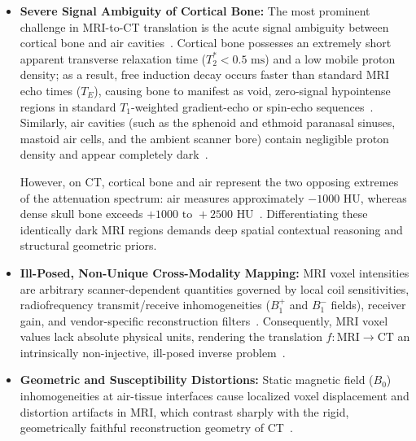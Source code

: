 \begin{itemize}
    \item \textbf{Severe Signal Ambiguity of Cortical Bone:} The most prominent challenge in MRI-to-CT translation is the acute signal ambiguity between cortical bone and air cavities~\cite{edmund2017review,thummerer2023synthrad2023}. Cortical bone possesses an extremely short apparent transverse relaxation time ($T_2^* < 0.5\text{ ms}$) and a low mobile proton density; as a result, free induction decay occurs faster than standard MRI echo times ($T_E$), causing bone to manifest as void, zero-signal hypointense regions in standard $T_1$-weighted gradient-echo or spin-echo sequences~\cite{edmund2017review}. Similarly, air cavities (such as the sphenoid and ethmoid paranasal sinuses, mastoid air cells, and the ambient scanner bore) contain negligible proton density and appear completely dark~\cite{edmund2017review,korsholm2018clinical}. 
    
    However, on CT, cortical bone and air represent the two opposing extremes of the attenuation spectrum: air measures approximately $-1000\text{ HU}$, whereas dense skull bone exceeds $+1000\text{ to }+2500\text{ HU}$~\cite{thummerer2023synthrad2023}. Differentiating these identically dark MRI regions demands deep spatial contextual reasoning and structural geometric priors.
    \item \textbf{Ill-Posed, Non-Unique Cross-Modality Mapping:} MRI voxel intensities are arbitrary scanner-dependent quantities governed by local coil sensitivities, radiofrequency transmit/receive inhomogeneities ($B_1^+$ and $B_1^-$ fields), receiver gain, and vendor-specific reconstruction filters~\cite{thummerer2023synthrad2023}. Consequently, MRI voxel values lack absolute physical units, rendering the translation $f: \text{MRI} \to \text{CT}$ an intrinsically non-injective, ill-posed inverse problem~\cite{lyu2022conversion,kazerouni2023diffusion}.
    \item \textbf{Geometric and Susceptibility Distortions:} Static magnetic field ($B_0$) inhomogeneities at air-tissue interfaces cause localized voxel displacement and distortion artifacts in MRI, which contrast sharply with the rigid, geometrically faithful reconstruction geometry of CT~\cite{edmund2017review}.
\end{itemize}

